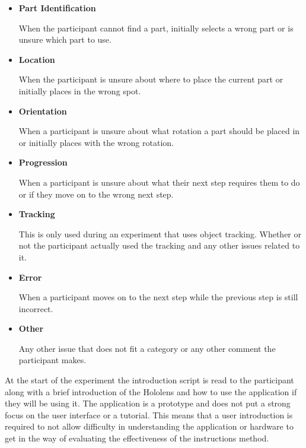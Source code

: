 \documentclass{l4proj}
\begin{document}
\begin{itemize}
    \item \textbf{Part Identification}
    
    When the participant cannot find a part, initially selects a wrong part or is unsure which part to use. 
    
    \item \textbf{Location}
    
    When the participant is unsure about where to place the current part or initially places in the wrong spot.
    
    \item \textbf{Orientation}
    
    When a participant is unsure about what rotation a part should be placed in or initially places with the wrong rotation.
    
    \item \textbf{Progression}
    
    When a participant is unsure about what their next step requires them to do or if they move on to the wrong next step.

    \item \textbf{Tracking}

    This is only used during an experiment that uses object tracking. Whether or not the participant actually used the tracking and any other issues related to it.
    
    \item \textbf{Error}
    
    When a participant moves on to the next step while the previous step is still incorrect.
    
    \item \textbf{Other}
    
    Any other issue that does not fit a category or any other comment the participant makes.
    
\end{itemize}

At the start of the experiment the introduction script is read to the participant along with a brief introduction of the Hololens and how to use the application if they will be using it. The application is a prototype and does not put a strong focus on the user interface or a tutorial. This means that a user introduction is required to not allow difficulty in understanding the application or hardware to get in the way of evaluating the effectiveness of the instructions method.
\end{document}
